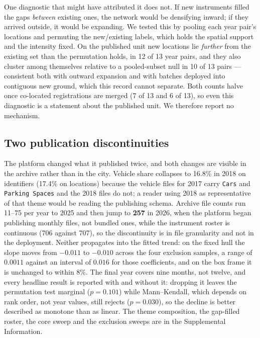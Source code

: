 \documentclass[fleqn,10pt,lineno]{wlpeerj}
\newcommand{\hullNoLastPermP}{0.101}
\newcommand{\hullNoLastMkP}{0.030}
\newcommand{\rlAbove}{12}
\newcommand{\rlPairs}{13}
\newcommand{\batchPairs}{10}
\newcommand{\batchTotal}{13}
\begin{document}
One diagnostic that might have attributed it does not. If new instruments filled the gaps
\emph{between} existing ones, the network would be densifying inward; if they arrived outside,
it would be expanding. We tested this by pooling each year pair's locations and permuting the
new/existing labels, which holds the spatial support and the intensity fixed. On the published
unit new locations lie \emph{further} from the existing set than the permutation holds, in
\rlAbove{} of \rlPairs{} year pairs, and they also cluster among themselves relative to a
pooled-subset null in \batchPairs{} of \batchTotal{} pairs --- consistent both with outward
expansion and with batches deployed into contiguous new ground, which this record cannot
separate. Both counts halve once co-located registrations are merged (\num{7} of \num{13} and
\num{6} of \num{13}), so even this diagnostic is a statement about the published unit. We
therefore report no mechanism.

\subsection*{Two publication discontinuities}
\label{sec:results-theme}

The platform changed what it published twice, and both changes are visible in the archive rather
than in the city. Vehicle share collapses to 16.8\% in 2018 on identifiers (17.4\% on locations)
because the vehicle files for 2017 carry \texttt{Cars} and \texttt{Parking~Spaces} and the 2018
files do not; a reader using 2018 as representative of that theme would be reading the
publishing schema. Archive file counts run 11--75 per year to 2025 and then jump to \textbf{257}
in 2026, when the platform began publishing monthly files, not bundled ones, while the
instrument roster is continuous (706 against 707), so the discontinuity is in file granularity
and not in the deployment. Neither propagates into the fitted trend: on the fixed hull the slope
moves from $-0.011$ to $-0.010$ across the four exclusion samples, a range of $0.0011$ against an
interval of $0.016$ for those coefficients, and on the box frame it is unchanged to within 8\%.
The final year covers nine months, not twelve, and every headline result is reported with
and without it: dropping it leaves the permutation test marginal ($p = \hullNoLastPermP$) while
Mann--Kendall, which depends on rank order, not year values, still rejects
($p = \hullNoLastMkP$), so the decline is better described as monotone than as linear. The theme
composition, the gap-filled roster, the core sweep and the exclusion sweeps are in the
Supplemental Information.
\end{document}
